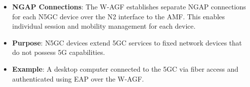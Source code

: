 \begin{itemize}
{\begin{itemize}
{                    }
              \item {
                    \textbf{\ac{NGAP} Connections}: The \ac{W-AGF} establishes separate \ac{NGAP} connections for each \ac{N5GC} device over the N2 interface to the \ac{AMF}. This enables individual session and mobility management for each device.
                    }
              \item {
                    \textbf{Purpose}: \ac{N5GC} devices extend \ac{5GC} services to fixed network devices that do not possess \ac{5G} capabilities.
                    }
              \item {
                    \textbf{Example}: A desktop computer connected to the \ac{5GC} via fiber access and authenticated using \ac{EAP} over the \ac{W-AGF}.
                    }
          \end{itemize}
          }
\end{itemize}

